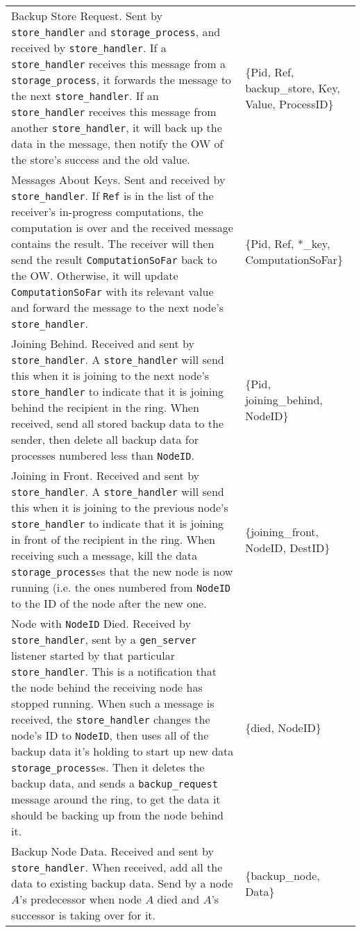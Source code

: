 \documentclass[12pt,letterpaper]{article}
\renewcommand{\tt}[1]{\texttt{#1}}
\newcommand{\sh}{\tt{store\_handler}}
\renewcommand{\sp}{\tt{storage\_process}}
\newcommand{\gs}{\tt{gen\_server}}
\begin{document}
\begin{longtable}{p{4.5in}T}
Backup Store Request. Sent by \sh{} and \sp, and received by \sh. If a \sh{} receives this message from a \sp, it forwards the message to the next \sh. If an \sh{} receives this message from another \sh, it will back up the data in the message, then notify the OW of the store's success and the old value. & 
\{Pid, Ref, backup\_store, Key, Value, ProcessID\} \\

Messages About Keys.  Sent and received by \sh.  If \tt{Ref} is in the list of the receiver's in-progress computations, the computation is over and the received message contains the result. The receiver will then send the result \tt{ComputationSoFar} back to the OW.  Otherwise, it will update \tt{ComputationSoFar} with its relevant value and forward the message to the next node's \sh.  &
\{Pid, Ref, *\_key, ComputationSoFar\} \\

Joining Behind. Received and sent by \sh. A \sh{} will send this when it is joining to the next node's \sh{} to indicate that it is joining behind the recipient in the ring. When received, send all stored backup data to the sender, then delete all backup data for processes numbered less than \tt{NodeID}. &
\{Pid, joining\_behind, NodeID\} \\

Joining in Front.  Received and sent by \sh. A \sh{} will send this when it is joining to the previous node's \sh{} to indicate that it is joining in front of the recipient in the ring. When receiving such a message, %
kill the data \sp es that the new node is now running (i.e. the ones numbered from \tt{NodeID} to the ID of the node after the new one. &
\{joining\_front, NodeID, DestID\} \\

Node with \tt{NodeID} Died.  Received by \sh, sent by a \gs{} listener started by that particular \sh. This is a notification that the node behind the receiving node has stopped running. When such a message is received, the \sh{} changes the node's ID to \tt{NodeID}, then uses all of the backup data it's holding to start up new data \sp es.  Then it deletes the backup data, and sends a \tt{backup\_request} message around the ring, to get the data it should be backing up from the node behind it. & \{died, NodeID\} \\

Backup Node Data.  Received and sent by \sh.  When received, add all the data to existing backup data. Send by a node $A$'s predecessor when node $A$ died and $A$'s successor is taking over for it.&
\{backup\_node, Data\} \\


\end{longtable}
\end{document}
